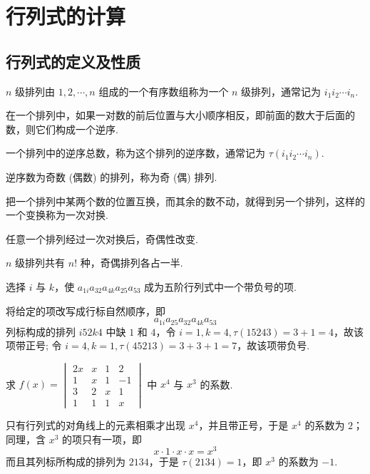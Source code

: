 \section{行列式的计算}

\subsection{行列式的定义及性质}

\begin{definition}
    $n $ 级排列由 $ 1,2, \cdots, n $ 组成的一个有序数组称为一个 $ n $ 级排列，通常记为 $ i_{1} i_{2} \cdots i_{n} $.
\end{definition}
\begin{definition}
    在一个排列中，如果一对数的前后位置与大小顺序相反，即前面的数大于后面的数，则它们构成一个逆序.
\end{definition}
\begin{definition}
    一个排列中的逆序总数，称为这个排列的逆序数，通常记为 $ \tau\left(i_{1} i_{2} \cdots i_{n}\right) $.
\end{definition}
\begin{definition}
    逆序数为奇数 (偶数) 的排列，称为奇 (偶) 排列.
\end{definition}
\begin{definition}
    把一个排列中某两个数的位置互换，而其余的数不动，就得到另一个排列，这样的一个变换称为一次对换.
\end{definition}
\begin{theorem}
    任意一个排列经过一次对换后，奇偶性改变.
\end{theorem}
\begin{theorem}
    $ n $ 级排列共有 $ n! $ 种，奇偶排列各占一半.
\end{theorem}

\begin{example}
    选择 $i$ 与 $k$，使 $a_{1i}a_{32}a_{4k}a_{25}a_{53}$ 成为五阶行列式中一个带负号的项.
\end{example}
\begin{solution}
    将给定的项改写成行标自然顺序，即 $$a_{1i}a_{25}a_{32}a_{4k}a_{53}$$
    列标构成的排列 $i52k4$ 中缺 $1$ 和 $4$，令 $i=1,k=4,\tau(15243)=3+1=4$，故该项带正号;
    令 $i=4,k=1,\tau(45213)=3+3+1=7$，故该项带负号.
\end{solution}

\begin{example}
    求 $\displaystyle f(x)=\begin{vmatrix}
            2x & x & 1 & 2  \\
            1  & x & 1 & -1 \\
            3  & 2 & x & 1  \\
            1  & 1 & 1 & x
        \end{vmatrix}$ 中 $x^4$ 与 $x^3$ 的系数.
\end{example}
\begin{solution}
    只有行列式的对角线上的元素相乘才出现 $x^4$，并且带正号，于是 $x^4$ 的系数为 $2$；
    同理，含 $x^3$ 的项只有一项，即 $$x\cdot 1\cdot x\cdot x=x^3$$
    而且其列标所构成的排列为 $2134$，于是 $\tau(2134)=1$，即 $x^3$ 的系数为 $-1.$
\end{solution}


